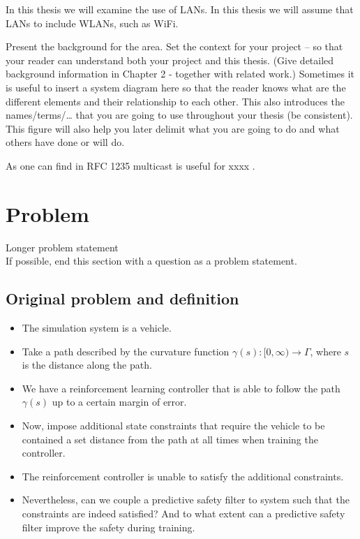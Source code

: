 \documentclass[english]{kththesis}
\begin{document}
In this thesis we will examine the use of \glspl{LAN}. In this thesis we will
assume that \glspl{LAN} to include \glspl{WLAN}, such as \gls{WiFi}.

Present the background for the area. Set the context for your project – so that your reader can understand both your project and this thesis. (Give detailed background information in Chapter 2 - together with related work.)
Sometimes it is useful to insert a system diagram here so that the reader
knows what are the different elements and their relationship to each
other. This also introduces the names/terms/… that you are going to use
throughout your thesis (be consistent). This figure will also help you later
delimit what you are going to do and what others have done or will do.

As one can find in RFC 1235\cite{ioannidis_coherent_1991} multicast is useful for xxxx .

\section{Problem}

Longer problem statement\\
If possible, end this section with a question as a problem statement.

\subsection{Original problem and definition}

\begin{itemize}
    \item The simulation system is a vehicle.
    \item Take a path described by the curvature function $\gamma(s): [0,
        \infty) \rightarrow \Gamma$, where $s$ is the distance along the path.
    \item We have a reinforcement learning controller that is able to follow
        the path $\gamma(s)$ up to a certain margin of error.
    \item Now, impose additional state constraints that require the vehicle to be
        contained a set distance from the path at all times when training the
        controller.
    \item The reinforcement controller is unable to satisfy the additional
        constraints.
    \item Nevertheless, can we couple a predictive safety filter to system such
        that the constraints are indeed satisfied? And to what extent can a
        predictive safety filter improve the safety during training.
\end{itemize}
\end{document}
